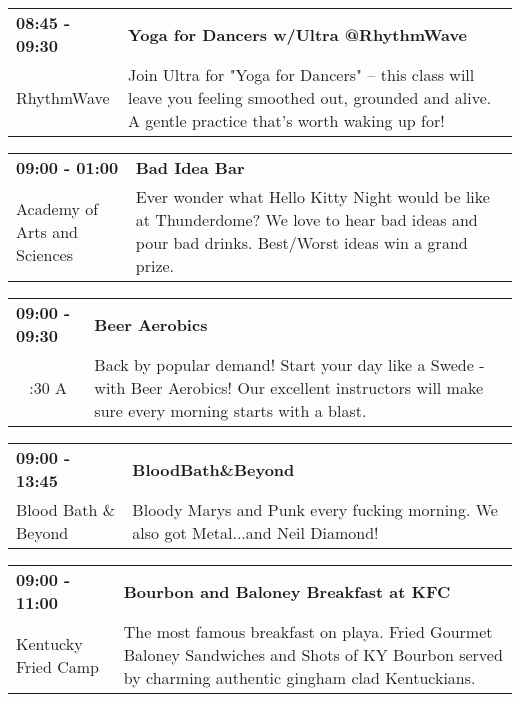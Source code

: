 \begin{tabular}{ p{1in} p{2.2in} }
    \textbf{08:45 - 09:30} & \textbf{Yoga for Dancers w/Ultra @RhythmWave} \\
    RhythmWave \newline  & Join Ultra for "Yoga for Dancers" -- this class will leave you feeling smoothed out, grounded and alive. A gentle practice that's worth waking up for! \\
    \hline 
\end{tabular}
    
\begin{tabular}{ p{1in} p{2.2in} }
    \textbf{09:00 - 01:00} & \textbf{Bad Idea Bar} \\
    Academy of Arts and Sciences \newline  & Ever wonder what Hello Kitty Night would be like at Thunderdome? We love to hear bad ideas and pour bad drinks. Best/Worst ideas win a grand prize. \\
    \hline 
\end{tabular}
    
\begin{tabular}{ p{1in} p{2.2in} }
    \textbf{09:00 - 09:30} & \textbf{Beer Aerobics} \\
    ~ \newline 4:30 A & Back by popular demand! Start your day like a Swede - with Beer Aerobics! Our excellent instructors will make sure every morning starts with a blast. \\
    \hline 
\end{tabular}
    
\begin{tabular}{ p{1in} p{2.2in} }
    \textbf{09:00 - 13:45} & \textbf{BloodBath\&Beyond} \\
    Blood Bath \& Beyond \newline  & Bloody Marys and Punk every fucking morning. We also got Metal...and Neil Diamond! \\
    \hline 
\end{tabular}
    
\begin{tabular}{ p{1in} p{2.2in} }
    \textbf{09:00 - 11:00} & \textbf{Bourbon and Baloney Breakfast at KFC} \\
    Kentucky Fried Camp \newline  & The most famous breakfast on playa. Fried Gourmet Baloney Sandwiches and Shots of KY Bourbon served by charming authentic gingham clad Kentuckians. \\
    \hline 
\end{tabular}
    
